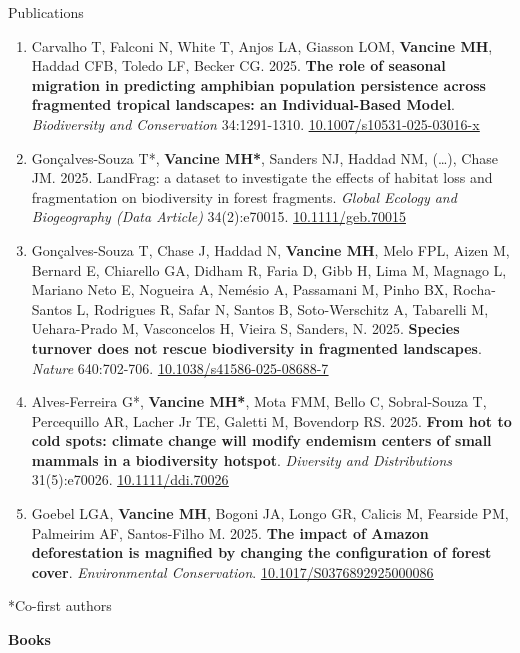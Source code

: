 \documentclass{resume}
\begin{document}
\begin{rSection}{Publications}
\begin{enumerate}
\item Carvalho T, Falconi N, White T, Anjos LA, Giasson LOM, {\bf Vancine MH}, Haddad CFB, Toledo LF, Becker CG. 2025. {\bf The role of seasonal migration in predicting amphibian population persistence across fragmented tropical landscapes: an Individual-Based Model}. {\it Biodiversity and Conservation} 34:1291-1310. \href{https://doi.org/10.1007/s10531-025-03016-x}{\underline{10.1007/s10531-025-03016-x}}

\item Gonçalves-Souza T*, {\bf Vancine MH*}, Sanders NJ, Haddad NM, (…), Chase JM. 2025. LandFrag: a dataset to investigate the effects of habitat loss and fragmentation on biodiversity in forest fragments. {\it Global Ecology and Biogeography (Data Article)} 34(2):e70015. \href{https://doi.org/10.1111/geb.70015}{\underline{10.1111/geb.70015}}

\item Gonçalves-Souza T, Chase J, Haddad N, {\bf Vancine MH}, Melo FPL, Aizen M, Bernard E, Chiarello GA, Didham R, Faria D, Gibb H, Lima M, Magnago L, Mariano Neto E, Nogueira A, Nemésio A, Passamani M, Pinho BX, Rocha-Santos L, Rodrigues R, Safar N, Santos B, Soto-Werschitz A, Tabarelli M, Uehara-Prado M, Vasconcelos H, Vieira S, Sanders, N. 2025. {\bf Species turnover does not rescue biodiversity in fragmented landscapes}. {\it Nature} 640:702-706. \href{https://doi.org/10.1038/s41586-025-08688-7}{\underline{10.1038/s41586-025-08688-7}}

\item Alves-Ferreira G*, {\bf Vancine MH*}, Mota FMM, Bello C, Sobral-Souza T, Percequillo AR, Lacher Jr TE, Galetti M, Bovendorp RS. 2025. {\bf From hot to cold spots: climate change will modify endemism centers of small mammals in a biodiversity hotspot}. {\it Diversity and Distributions} 31(5):e70026. \href{https://doi.org/10.1111/ddi.70026}{\underline{10.1111/ddi.70026}} 

\item Goebel LGA, {\bf Vancine MH}, Bogoni JA, Longo GR, Calicis M, Fearside PM, Palmeirim AF, Santos-Filho M. 2025. {\bf The impact of Amazon deforestation is magnified by changing the configuration of forest cover}. {\it Environmental Conservation}. \href{https://doi.org/10.1017/S0376892925000086}{\underline{10.1017/S0376892925000086}}

\end{enumerate} 

*Co-first authors

{\bf Books}


\end{rSection}
\end{document}
